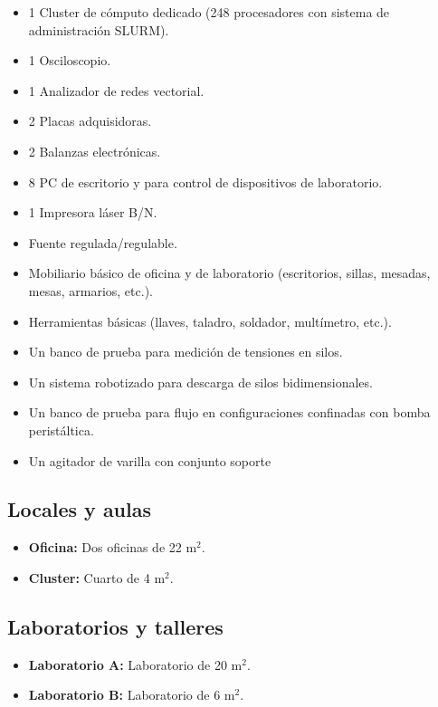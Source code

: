 \documentclass[a4paper,11pt,twoside,final,titlepage,onecolumn,openright]{report}
\begin{document}
\begin{itemize}
 \item 1 Cluster de cómputo dedicado (248 procesadores con sistema de administración SLURM).
 \item 1 Osciloscopio.
 \item 1 Analizador de redes vectorial.
 \item 2 Placas adquisidoras.
 \item 2 Balanzas electrónicas.
 \item 8 PC de escritorio y para control de dispositivos de laboratorio.
 \item 1 Impresora láser B/N.
 \item Fuente regulada/regulable.
 \item Mobiliario básico de oficina y de laboratorio (escritorios, sillas, mesadas, mesas, armarios, etc.).
 \item Herramientas básicas (llaves, taladro, soldador, multímetro, etc.).
 \item Un banco de prueba para medición de tensiones en silos.
 \item Un sistema robotizado para descarga de silos bidimensionales.
 \item Un banco de prueba para flujo en configuraciones confinadas con bomba peristáltica.
 \item Un agitador de varilla con conjunto soporte
\end{itemize}


\subsection{Locales y aulas}

\begin{itemize}
 \item {\bf Oficina:} Dos oficinas de 22 m$^2$. 
 \item {\bf Cluster:} Cuarto de 4 m$^2$. 
\end{itemize}

\subsection{Laboratorios y talleres}

\begin{itemize}
 \item {\bf Laboratorio A:} Laboratorio de 20 m$^2$.
 \item {\bf Laboratorio B:} Laboratorio de 6 m$^2$.
\end{itemize}
\end{document}
